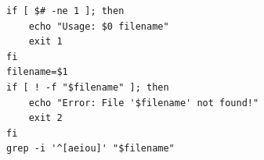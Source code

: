 \begin{verbatim}
if [ $# -ne 1 ]; then
    echo "Usage: $0 filename"
    exit 1
fi
filename=$1
if [ ! -f "$filename" ]; then
    echo "Error: File '$filename' not found!"
    exit 2
fi
grep -i '^[aeiou]' "$filename"
\end{verbatim}